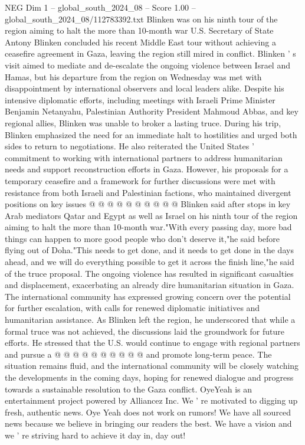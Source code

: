\begin{textsample}{NEG Dim 1 – global\_south\_2024\_08 – Score 1.00 – global\_south\_2024\_08/112783392.txt}  \label{ex:f1_neg_120}
Blinken was on his ninth tour of the region aiming to halt the more than 10-month war U.S.
Secretary of State Antony Blinken concluded his recent Middle East tour without achieving a ceasefire agreement in Gaza, leaving the region still mired in conflict.
Blinken ' s visit aimed to mediate and de-escalate the ongoing violence between Israel and Hamas, but his departure from the region on Wednesday was met with disappointment by international observers and local leaders alike.
Despite his intensive diplomatic efforts, including meetings with Israeli Prime Minister Benjamin Netanyahu, Palestinian Authority President Mahmoud Abbas, and key regional allies, Blinken was unable to broker a lasting truce.
During his trip, Blinken emphasized the need for an immediate halt to hostilities and urged both sides to return to negotiations.
He also reiterated the United States ' commitment to working with international partners to address humanitarian needs and support reconstruction efforts in Gaza.
However, his proposals for a temporary ceasefire and a framework for further discussions were met with resistance from both Israeli and Palestinian factions, who maintained divergent positions on key issues @ @ @ @ @ @ @ @ @ @ Blinken said after stops in key Arab mediators Qatar and Egypt as well as Israel on his ninth tour of the region aiming to halt the more than 10-month war."With every passing day, more bad things can happen to more good people who don't deserve it,"he said before flying out of Doha."This needs to get done, and it needs to get done in the days ahead, and we will do everything possible to get it across the finish line,"he said of the truce proposal.
The ongoing violence has resulted in significant casualties and displacement, exacerbating an already dire humanitarian situation in Gaza.
The international community has expressed growing concern over the potential for further escalation, with calls for renewed diplomatic initiatives and humanitarian assistance.
As Blinken left the region, he underscored that while a formal truce was not achieved, the discussions laid the groundwork for future efforts.
He stressed that the U.S. would continue to engage with regional partners and pursue a @ @ @ @ @ @ @ @ @ @ and promote long-term peace.
The situation remains fluid, and the international community will be closely watching the developments in the coming days, hoping for renewed dialogue and progress towards a sustainable resolution to the Gaza conflict.
OyeYeah is an entertainment project powered by Alliancez Inc.
We ' re motivated to digging up fresh, authentic news.
Oye Yeah does not work on rumors!
We have all sourced news because we believe in bringing our readers the best.
We have a vision and we ' re striving hard to achieve it day in, day out!

\end{textsample}
